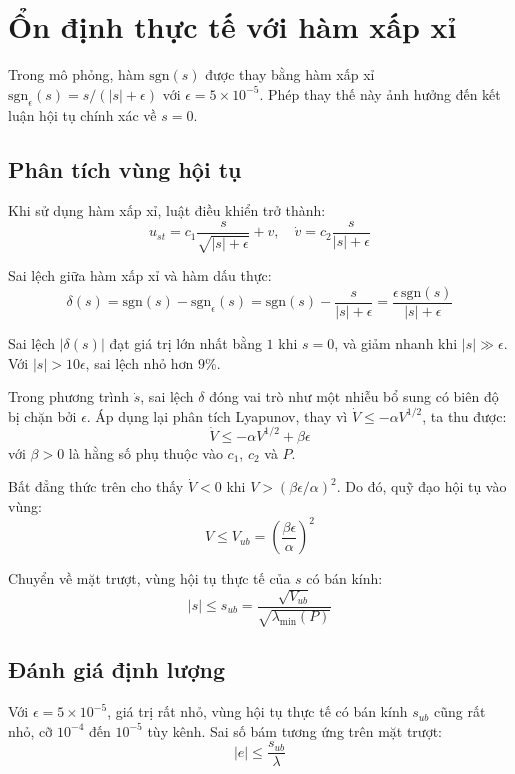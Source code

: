 \documentclass[12pt,a4paper]{report}
\begin{document}
\section{Ổn định thực tế với hàm xấp xỉ}
Trong mô phỏng, hàm $\text{sgn}(s)$ được thay bằng hàm xấp xỉ $\text{sgn}_\epsilon(s) = s / (|s| + \epsilon)$ với $\epsilon = 5 \times 10^{-5}$. Phép thay thế này ảnh hưởng đến kết luận hội tụ chính xác về $s = 0$.

\subsection{Phân tích vùng hội tụ}
Khi sử dụng hàm xấp xỉ, luật điều khiển trở thành:
\begin{equation}
u_{st} = c_1 \frac{s}{\sqrt{|s| + \epsilon}} + v, \quad \dot{v} = c_2 \frac{s}{|s| + \epsilon}
\end{equation}

Sai lệch giữa hàm xấp xỉ và hàm dấu thực:
\begin{equation}
\delta(s) = \text{sgn}(s) - \text{sgn}_\epsilon(s) = \text{sgn}(s) - \frac{s}{|s| + \epsilon} = \frac{\epsilon \, \text{sgn}(s)}{|s| + \epsilon}
\end{equation}

Sai lệch $|\delta(s)|$ đạt giá trị lớn nhất bằng $1$ khi $s = 0$, và giảm nhanh khi $|s| \gg \epsilon$. Với $|s| > 10\epsilon$, sai lệch nhỏ hơn $9\%$.

Trong phương trình $\dot{s}$, sai lệch $\delta$ đóng vai trò như một nhiễu bổ sung có biên độ bị chặn bởi $\epsilon$. Áp dụng lại phân tích Lyapunov, thay vì $\dot{V} \le -\alpha V^{1/2}$, ta thu được:
\begin{equation}
\dot{V} \le -\alpha V^{1/2} + \beta \epsilon
\end{equation}
với $\beta > 0$ là hằng số phụ thuộc vào $c_1$, $c_2$ và $P$.

Bất đẳng thức trên cho thấy $\dot{V} < 0$ khi $V > (\beta \epsilon / \alpha)^2$. Do đó, quỹ đạo hội tụ vào vùng:
\begin{equation}
V \le V_{ub} = \left(\frac{\beta \epsilon}{\alpha}\right)^2
\end{equation}

Chuyển về mặt trượt, vùng hội tụ thực tế của $s$ có bán kính:
\begin{equation}
|s| \le s_{ub} = \frac{\sqrt{V_{ub}}}{\sqrt{\lambda_{\min}(P)}}
\end{equation}

\subsection{Đánh giá định lượng}
Với $\epsilon = 5 \times 10^{-5}$, giá trị rất nhỏ, vùng hội tụ thực tế có bán kính $s_{ub}$ cũng rất nhỏ, cỡ $10^{-4}$ đến $10^{-5}$ tùy kênh. Sai số bám tương ứng trên mặt trượt:
\begin{equation}
|e| \le \frac{s_{ub}}{\lambda}
\end{equation}
\end{document}
